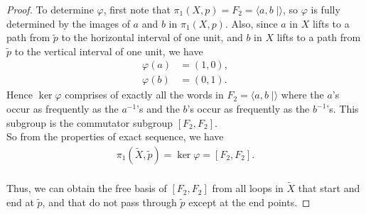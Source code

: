 \documentclass{article}
\begin{document}
\begin{enumerate}[label={\bf Q\arabic*:}]
\begin{proof}
      To determine $\varphi$, first note that $\pi_1(X,p)=F_2=\langle
      a,b\;|\rangle$, so $\varphi$ is fully determined by the images of $a$
      and $b$ in $\pi_1(X,p)$. Also, since $a$ in $X$ lifts to a path from
      $\widetilde{p}$ to the horizontal interval of one unit, and $b$ in
      $X$ lifts to a path from $\widetilde{p}$ to the vertical interval of
      one unit, we have
      \begin{align*}
        \varphi(a)  &=(1,0), \\
        \varphi(b)  &=(0,1).
      \end{align*}
      Hence $\ker\varphi$ comprises of exactly all the words in
      $F_2=\langle a,b\;|\rangle$ where the $a$'s occur as frequently as
      the $a^{-1}$'s and the $b$'s occur as frequently as the $b^{-1}$'s.
      This subgroup is the commutator subgroup $[F_2,F_2]$. \\

      So from the properties of exact sequence, we have
      \begin{align*}
        \pi_1(\widetilde{X},\widetilde{p})=\ker\varphi = [F_2,F_2]. \\
      \end{align*}

      Thus, we can obtain the free basis of $[F_2,F_2]$ from all loops in
      $\widetilde{X}$ that start and end at $\widetilde{p}$, and that do
      not pass through $\widetilde{p}$ except at the end points.
    \end{proof}
\end{enumerate}
\end{document}
